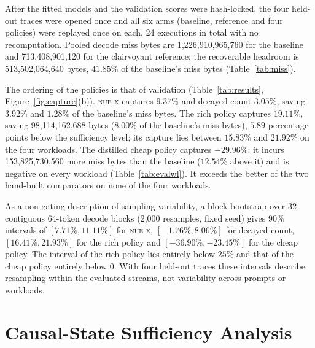 \documentclass[11pt]{article}
\theoremstyle{plain}
\theoremstyle{definition}
\newcommand{\nuex}{\textsc{nue-x}}
\begin{document}
After the fitted models and the validation scores were hash-locked, the four held-out traces were opened once and all six arms (baseline, reference and four policies) were replayed once on each, 24 executions in total with no recomputation. Pooled decode miss bytes are 1{,}226{,}910{,}965{,}760 for the baseline and 713{,}408{,}901{,}120 for the clairvoyant reference; the recoverable headroom is 513{,}502{,}064{,}640 bytes, $41.85\%$ of the baseline's miss bytes (Table~\ref{tab:miss}).



The ordering of the policies is that of validation (Table~\ref{tab:results}, Figure~\ref{fig:capture}(b)). \nuex{} captures $9.37\%$ and decayed count $3.05\%$, saving $3.92\%$ and $1.28\%$ of the baseline's miss bytes. The rich policy captures $19.11\%$, saving 98{,}114{,}162{,}688 bytes ($8.00\%$ of the baseline's miss bytes), $5.89$ percentage points below the sufficiency level; its capture lies between $15.83\%$ and $21.92\%$ on the four workloads. The distilled cheap policy captures $-29.96\%$: it incurs 153{,}825{,}730{,}560 more miss bytes than the baseline ($12.54\%$ above it) and is negative on every workload (Table~\ref{tab:evalwl}). It exceeds the better of the two hand-built comparators on none of the four workloads.



As a non-gating description of sampling variability, a block bootstrap over 32 contiguous 64-token decode blocks (2{,}000 resamples, fixed seed) gives 90\% intervals of $[7.71\%, 11.11\%]$ for \nuex{}, $[-1.76\%, 8.06\%]$ for decayed count, $[16.41\%, 21.93\%]$ for the rich policy and $[-36.90\%, -23.45\%]$ for the cheap policy. The interval of the rich policy lies entirely below $25\%$ and that of the cheap policy entirely below $0$. With four held-out traces these intervals describe resampling within the evaluated streams, not variability across prompts or workloads.

\section{Causal-State Sufficiency Analysis}
\label{sec:analysis}
\end{document}

